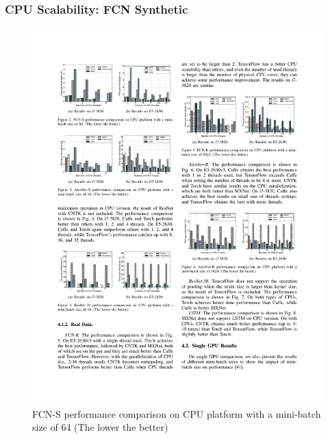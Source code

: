 \begin{frame}
	\MyLogo
	\frametitle{CPU Scalability: FCN Synthetic}  
	\begin{figure}[htbp] 
		\includegraphics[width=\linewidth]{figures/FCN-S1.pdf} 
		\caption{FCN-S performance comparison on CPU platform with a mini-batch size of 64 (The lower the better)}
	\end{figure}
\end{frame}


